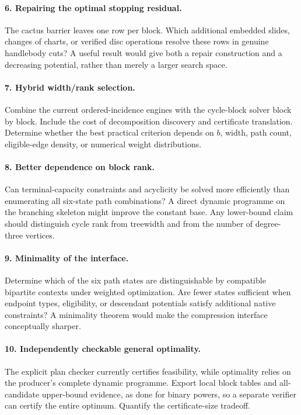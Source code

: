\documentclass[11pt,letterpaper]{article}
\theoremstyle{definition}
\theoremstyle{remark}
\begin{document}
\paragraph{6. Repairing the optimal stopping residual.}
The cactus barrier leaves one row per block. Which additional embedded slides, changes of charts, or verified disc operations resolve these rows in genuine handlebody cuts? A useful result would give both a repair construction and a decreasing potential, rather than merely a larger search space.

\paragraph{7. Hybrid width/rank selection.}
Combine the current ordered-incidence engines with the cycle-block solver block by block. Include the cost of decomposition discovery and certificate translation. Determine whether the best practical criterion depends on $b$, width, path count, eligible-edge density, or numerical weight distributions.

\paragraph{8. Better dependence on block rank.}
Can terminal-capacity constraints and acyclicity be solved more efficiently than enumerating all six-state path combinations? A direct dynamic programme on the branching skeleton might improve the constant base. Any lower-bound claim should distinguish cycle rank from treewidth and from the number of degree-three vertices.

\paragraph{9. Minimality of the interface.}
Determine which of the six path states are distinguishable by compatible bipartite contexts under weighted optimization. Are fewer states sufficient when endpoint types, eligibility, or descendant potentials satisfy additional native constraints? A minimality theorem would make the compression interface conceptually sharper.

\paragraph{10. Independently checkable general optimality.}
The explicit plan checker currently certifies feasibility, while optimality relies on the producer's complete dynamic programme. Export local block tables and all-candidate upper-bound evidence, as done for binary powers, so a separate verifier can certify the entire optimum. Quantify the certificate-size tradeoff.
\end{document}
